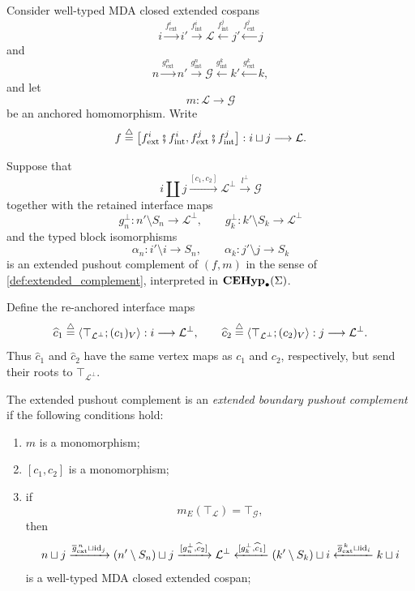 \begin{definition}
\label{def:lambda-boundary-complement}
Consider well-typed MDA closed extended cospans
\[
  i
  \xrightarrow{f_{\mathrm{ext}}^{i}}
  i'
  \xrightarrow{f_{\mathrm{int}}^{i}}
  \mathcal L
  \xleftarrow{f_{\mathrm{int}}^{j}}
  j'
  \xleftarrow{f_{\mathrm{ext}}^{j}}
  j
\]
and
\[
  n
  \xrightarrow{g_{\mathrm{ext}}^{n}}
  n'
  \xrightarrow{g_{\mathrm{int}}^{n}}
  \mathcal G
  \xleftarrow{g_{\mathrm{int}}^{k}}
  k'
  \xleftarrow{g_{\mathrm{ext}}^{k}}
  k,
\]
and let
\[
  m:\mathcal L\longrightarrow\mathcal G
\]
be an anchored homomorphism. Write
\[
  f
  \stackrel{\triangle}{=}
  \bigl[
    f_{\mathrm{ext}}^{i}\fatsemi f_{\mathrm{int}}^{i},
    f_{\mathrm{ext}}^{j}\fatsemi f_{\mathrm{int}}^{j}
  \bigr]
  :
  i\sqcup j\longrightarrow\mathcal L.
\]

Suppose that
\[
  i \coprod j
  \xrightarrow{[c_1,c_2]}
  \mathcal L^\bot
  \xrightarrow{l^\bot}
  \mathcal G
\]
together with the retained interface maps
\[
  g_n^\bot:
  n'\setminus S_n\longrightarrow\mathcal L^\bot,
  \qquad
  g_k^\bot:
  k'\setminus S_k\longrightarrow\mathcal L^\bot
\]
and the typed block isomorphisms
\[
  \alpha_n:i'\setminus i\longrightarrow S_n,
  \qquad
  \alpha_k:j'\setminus j\longrightarrow S_k
\]
is an extended pushout complement of \((f,m)\) in the sense of
\cref{def:extended_complement}, interpreted in
\(\mathbf{CEHyp}_{\bullet}(\Sigma)\).

Define the re-anchored interface maps
\[
  \widehat c_1
  \stackrel{\triangle}{=}
  \left\langle
    \top_{\mathcal L^\bot};(c_1)_V
  \right\rangle
  :
  i\longrightarrow\mathcal L^\bot,
  \qquad
  \widehat c_2
  \stackrel{\triangle}{=}
  \left\langle
    \top_{\mathcal L^\bot};(c_2)_V
  \right\rangle
  :
  j\longrightarrow\mathcal L^\bot.
\]
Thus \(\widehat c_1\) and \(\widehat c_2\) have the same vertex maps as
\(c_1\) and \(c_2\), respectively, but send their roots to
\(\top_{\mathcal L^\bot}\).

The extended pushout complement is an \emph{extended boundary pushout
complement} if the following conditions hold:

\begin{enumerate}
  \item \(m\) is a monomorphism;

  \item \([c_1,c_2]\) is a monomorphism;

  \item if
  \[
    m_E(\top_{\mathcal L})=\top_{\mathcal G},
  \]
  then
  \[
    n \sqcup j
    \xrightarrow{
      \overline g_{\mathrm{ext}}^{\,n} \sqcup \operatorname{id}_j
    }
    (n'\setminus S_n) \sqcup j
    \xrightarrow{
      [g_n^\bot,\widehat c_2]
    }
    \mathcal L^\bot
    \xleftarrow{
      [g_k^\bot,\widehat c_1]
    }
    (k'\setminus S_k) \sqcup i
    \xleftarrow{
      \overline g_{\mathrm{ext}}^{\,k} \sqcup \operatorname{id}_i
    }
    k \sqcup i
  \]
  is a well-typed MDA closed extended cospan;


\end{enumerate}
\end{definition}
